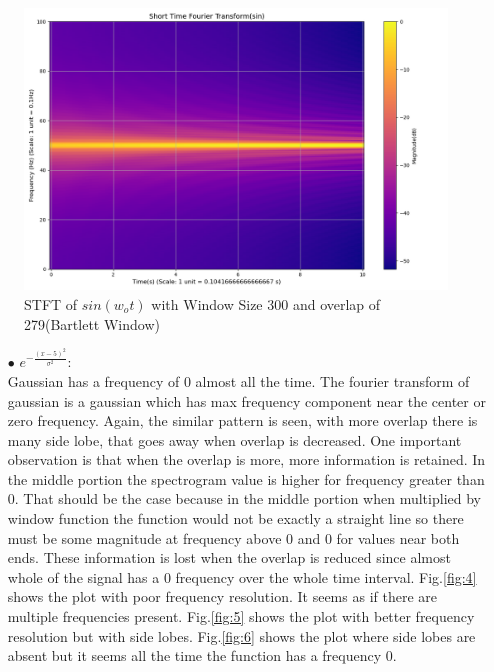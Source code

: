 \documentclass[12pt,a4paper,onecolumn]{exam}
\begin{document}
\begin{solution}
\begin{itemize}
\begin{itemize}
        \begin{figure}[H]
        \centering
        \includegraphics[scale = 0.35]{sin_21_300.0.png}
        \caption{STFT of $sin(w_ot)$ with Window Size 300 and overlap of 279(Bartlett Window)}
        \label{fig:3}
        \end{figure}
      
        \begin{itemize}
        
        \item[$\bullet$] $e^{-\frac{(x-5)^2}{\sigma^2}}$:\\
        Gaussian has a frequency of 0 almost all the time. The fourier transform of gaussian is a gaussian which has max frequency component near the center or zero frequency. Again, the similar pattern is seen, with more overlap there is many side lobe, that goes away when overlap is decreased. One important observation is that when the overlap is more, more information is retained. In the middle portion the spectrogram value is higher for frequency greater than 0. That should be the case because in the middle portion when multiplied by window function the function would not be exactly a straight line so there must be some magnitude at frequency above 0 and 0 for values near both ends. These information is lost when the overlap is reduced since almost whole of the signal has a 0 frequency over the whole time interval. Fig.\ref{fig:4} shows the plot with poor frequency resolution. It seems as if there are multiple frequencies present. Fig.\ref{fig:5} shows the plot with better frequency resolution but with side lobes. Fig.\ref{fig:6} shows the plot where side lobes are absent but it seems all the time the function has a frequency 0. 
        

\end{itemize}
\end{itemize}
\end{itemize}
\end{solution}
\end{document}
